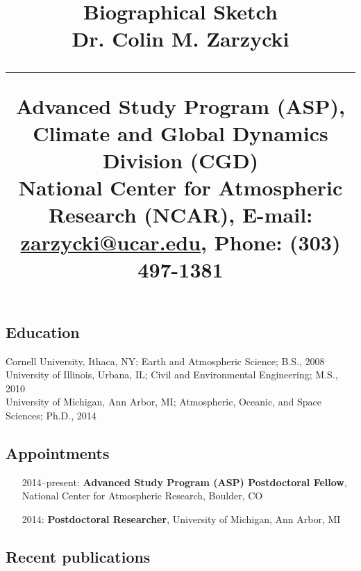 \documentclass[11pt]{article}
\title{%
        \vspace{-2\baselineskip}
            \normalsize
            Biographical Sketch\\
            {\normalsize\textbf{Dr. Colin M. Zarzycki}}\\
            \vspace{0.5\baselineskip}
            \hrule
            \vspace{0.5\baselineskip}
            Advanced Study Program (ASP), Climate and Global Dynamics Division (CGD)\\
            National Center for Atmospheric Research (NCAR),
            E-mail: \href{mailto:zarzycki@ucar.edu}{zarzycki@ucar.edu},
            Phone: (303) 497-1381
        \vspace{-1.5ex}
        }
\date{}
\author{}
\begin{document}
\maketitle
\vspace{-4\baselineskip}

\subsection*{Education}

    Cornell University, Ithaca, NY;
        Earth and Atmospheric Science;
        B.S., 2008
        \\
    University of Illinois, Urbana, IL;
        Civil and Environmental Engineering;
        M.S., 2010
        \\
    University of Michigan, Ann Arbor, MI;
        Atmospheric, Oceanic, and Space Sciences;
        Ph.D., 2014

\subsection*{Appointments}

\begin{itemize}[label={--9999:},leftmargin=*,itemsep=0pt]

    \item[2014--present:]
        \textbf{Advanced Study Program (ASP) Postdoctoral Fellow},
        National Center for Atmospheric Research,
        Boulder, CO

    \item[2014:]
        \textbf{Postdoctoral Researcher},
        University of Michigan,
        Ann Arbor, MI

\end{itemize}

\subsection*{Recent publications}
\end{document}
